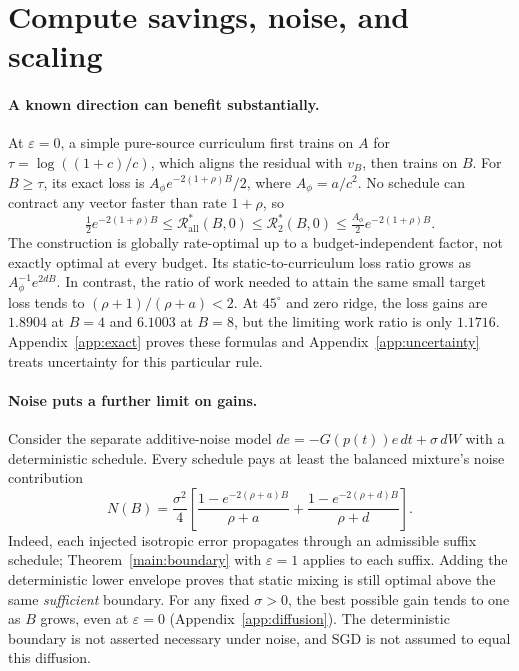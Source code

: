 \documentclass{article}
\theoremstyle{remark}\newtheorem{remark}[theorem]{Remark}
\newcommand{\R}{\mathcal R}
\newcommand{\Rt}{\R_{2}^*}
\newcommand{\Ra}{\R_{\mathrm{all}}^*}
\begin{document}
\section{Compute savings, noise, and scaling}\label{sec:consequences}
\paragraph{A known direction can benefit substantially.}
At $\varepsilon=0$, a simple pure-source curriculum first trains on $A$ for $\tau=\log((1+c)/c)$, which aligns the residual with $v_B$, then trains on $B$. For $B\ge\tau$, its exact loss is $A_\phi e^{-2(1+\rho)B}/2$, where $A_\phi=a/c^2$. No schedule can contract any vector faster than rate $1+\rho$, so
\begin{equation}
 \tfrac12e^{-2(1+\rho)B}\le\Ra(B,0)\le\Rt(B,0)\le\tfrac{A_\phi}{2}e^{-2(1+\rho)B}.
\end{equation}
The construction is globally rate-optimal up to a budget-independent factor, not exactly optimal at every budget. Its static-to-curriculum loss ratio grows as $A_\phi^{-1}e^{2dB}$. In contrast, the ratio of work needed to attain the same small target loss tends to $(\rho+1)/(\rho+a)<2$. At $45^\circ$ and zero ridge, the loss gains are $1.8904$ at $B=4$ and $6.1003$ at $B=8$, but the limiting work ratio is only $1.1716$. Appendix~\ref{app:exact} proves these formulas and Appendix~\ref{app:uncertainty} treats uncertainty for this particular rule.

\paragraph{Noise puts a further limit on gains.}
Consider the separate additive-noise model $de=-G(p(t))e\,dt+\sigma\,dW$ with a deterministic schedule. Every schedule pays at least the balanced mixture's noise contribution
\begin{equation}
 N(B)=\frac{\sigma^2}{4}\left[\frac{1-e^{-2(\rho+a)B}}{\rho+a}+\frac{1-e^{-2(\rho+d)B}}{\rho+d}\right].\label{eq:mainnoise}
\end{equation}
Indeed, each injected isotropic error propagates through an admissible suffix schedule; Theorem~\ref{main:boundary} with $\varepsilon=1$ applies to each suffix. Adding the deterministic lower envelope proves that static mixing is still optimal above the same \emph{sufficient} boundary. For any fixed $\sigma>0$, the best possible gain tends to one as $B$ grows, even at $\varepsilon=0$ (Appendix~\ref{app:diffusion}). The deterministic boundary is not asserted necessary under noise, and SGD is not assumed to equal this diffusion.
\end{document}

